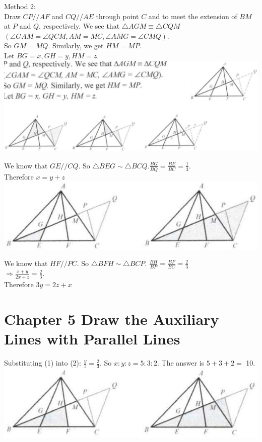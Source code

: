 \documentclass[10pt]{article}
\begin{document}
Method 2:\\
Draw \(C P / / A F\) and \(C Q / / A E\) through point \(C\) and to meet the extension of \(B M\) at \(P\) and \(Q\), respectively. We see that \(\triangle A G M \equiv \triangle C Q M\)\\
\((\angle G A M=\angle Q C M, A M=M C, \angle A M G=\angle C M Q)\).\\
So \(G M=M Q\). Similarly, we get \(H M=M P\).\\
Let \(B G=x, G H=y, H M=z\).\\
\includegraphics[max width=\textwidth, center]{2025_04_17_97bc1f7e44d93c271a88g-119(2)}

We know that \(G E / / C Q\). So \(\triangle B E G \sim \triangle B C Q . \frac{B G}{B Q}=\frac{B E}{B C}=\frac{1}{3}\).\\
Therefore \(x=y+z\)\\
\includegraphics[max width=\textwidth, center]{2025_04_17_97bc1f7e44d93c271a88g-119(1)}

We know that \(H F / / P C\). So \(\triangle B F H \sim \triangle B C P\). \(\frac{B H}{B P}=\frac{B F}{B C}=\frac{2}{3}\)\\
\(\Rightarrow \frac{x+y}{2 x+z}=\frac{2}{3}\).\\
Therefore \(3 y=2 z+x\)

\section*{Chapter 5 Draw the Auxiliary Lines with Parallel Lines}
Substituting (1) into (2): \(\frac{y}{z}=\frac{2}{3}\). So \(x: y: z=5: 3: 2\). The answer is \(5+3+2=\) 10.\\
\includegraphics[max width=\textwidth, center]{2025_04_17_97bc1f7e44d93c271a88g-120(2)}
\end{document}
